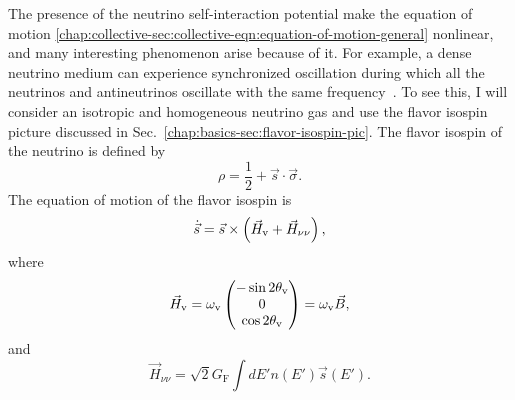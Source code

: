 The presence of the neutrino self-interaction potential make the equation of motion \ref{chap:collective-sec:collective-eqn:equation-of-motion-general} nonlinear, and many interesting phenomenon arise because of it. For example, a dense neutrino medium can experience synchronized oscillation during which all the neutrinos and antineutrinos oscillate with the same frequency~\cite{Pastor2002,Hannestad2006,Raffelt2008,Duan2010}. To see this, I will consider an isotropic and homogeneous neutrino gas and use the flavor isospin picture discussed in Sec.~\ref{chap:basics-sec:flavor-isospin-pic}. The flavor isospin of the neutrino is defined by
\begin{equation}
   \rho = \frac{1}{2} + \vec s \cdot \vec \sigma.
\end{equation}
The equation of motion of the flavor isospin is
\begin{equation}
    \dot{\vec s} = \vec s \times \left(\vec H_\vv + \vec H_{\nu\nu} \right),
    \label{chap:collective-eqn:flavor-isospin-eom}
\end{equation}
where
\begin{equation}
   \vec H_{\mathrm v} =  \omega_{\mathrm v}\begin{pmatrix}
   -\sin 2\theta_{\mathrm v}\\
   0 \\
   \cos 2\theta_{\mathrm v}
   \end{pmatrix} = \omega_\mathrm v \vec B,
\end{equation}
and
\begin{equation}
\vec H_{\nu\nu} = \sqrt{2}G_{\mathrm F} \int d E' n(E') \vec s(E').
\end{equation}
